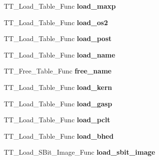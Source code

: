 \begin{DoxyCompactItemize}
\item 
\mbox{\label{structSFNT__Interface___a399c84ff5f64ebe022b0de02b474605f}} 
T\+T\+\_\+\+Load\+\_\+\+Table\+\_\+\+Func {\bfseries load\+\_\+maxp}
\item 
\mbox{\label{structSFNT__Interface___a8976abd388072452e40dc7669c4882e2}} 
T\+T\+\_\+\+Load\+\_\+\+Table\+\_\+\+Func {\bfseries load\+\_\+os2}
\item 
\mbox{\label{structSFNT__Interface___a9781e592014f8f3b55e5035ddadb0492}} 
T\+T\+\_\+\+Load\+\_\+\+Table\+\_\+\+Func {\bfseries load\+\_\+post}
\item 
\mbox{\label{structSFNT__Interface___a139d44712b3fa1432cb76cfd07767312}} 
T\+T\+\_\+\+Load\+\_\+\+Table\+\_\+\+Func {\bfseries load\+\_\+name}
\item 
\mbox{\label{structSFNT__Interface___a158489e92faa08d1d8dc651da4e8f0d3}} 
T\+T\+\_\+\+Free\+\_\+\+Table\+\_\+\+Func {\bfseries free\+\_\+name}
\item 
\mbox{\label{structSFNT__Interface___a351663c6b34807a9c0445498bf29f3d6}} 
T\+T\+\_\+\+Load\+\_\+\+Table\+\_\+\+Func {\bfseries load\+\_\+kern}
\item 
\mbox{\label{structSFNT__Interface___a294bb9a099cd4a5594e52aa9f63d3e53}} 
T\+T\+\_\+\+Load\+\_\+\+Table\+\_\+\+Func {\bfseries load\+\_\+gasp}
\item 
\mbox{\label{structSFNT__Interface___adfeb4667e09e03da5244fe5fd3f088e4}} 
T\+T\+\_\+\+Load\+\_\+\+Table\+\_\+\+Func {\bfseries load\+\_\+pclt}
\item 
\mbox{\label{structSFNT__Interface___a4f1924327f1802067c4923e327ad5e46}} 
T\+T\+\_\+\+Load\+\_\+\+Table\+\_\+\+Func {\bfseries load\+\_\+bhed}
\item 
\mbox{\label{structSFNT__Interface___ac0c68f047a4dbe7467ae422cd810e917}} 
T\+T\+\_\+\+Load\+\_\+\+S\+Bit\+\_\+\+Image\+\_\+\+Func {\bfseries load\+\_\+sbit\+\_\+image}

\end{DoxyCompactItemize}
